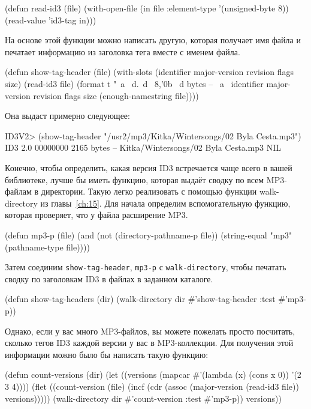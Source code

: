\begin{myverb}
(defun read-id3 (file)
  (with-open-file (in file :element-type '(unsigned-byte 8))
    (read-value 'id3-tag in)))
\end{myverb}

На основе этой функции можно написать другую, которая получает имя файла и печатает
информацию из заголовка тега вместе с именем файла.

\begin{myverb}
(defun show-tag-header (file)
  (with-slots (identifier major-version revision flags size) (read-id3 file)
    (format t "~a ~d.~d ~8,'0b ~d bytes -- ~a~%
            identifier major-version revision flags size (enough-namestring file))))
\end{myverb}

Она выдаст примерно следующее:

\begin{myverb}
ID3V2> (show-tag-header "/usr2/mp3/Kitka/Wintersongs/02 Byla Cesta.mp3")
ID3 2.0 00000000 2165 bytes -- Kitka/Wintersongs/02 Byla Cesta.mp3
NIL
\end{myverb}

Конечно, чтобы определить, какая версия ID3 встречается чаще всего в вашей библиотеке,
лучше бы иметь функцию, которая выдаёт сводку по всем MP3-файлам в директории. Такую легко
реализовать с помощью функции walk-directory из главы~\ref{ch:15}. Для начала определим
вспомогательную функцию, которая проверяет, что у файла расширение MP3.

\begin{myverb}
(defun mp3-p (file)
  (and
   (not (directory-pathname-p file))
   (string-equal "mp3" (pathname-type file))))
\end{myverb}

Затем соединим \lstinline{show-tag-header}, \lstinline{mp3-p} с \lstinline{walk-directory}, чтобы
печатать сводку по заголовкам ID3 в файлах в заданном каталоге.

\begin{myverb}
(defun show-tag-headers (dir) 
  (walk-directory dir #'show-tag-header :test #'mp3-p))
\end{myverb}

Однако, если у вас много MP3-файлов, вы можете пожелать просто посчитать, сколько тегов
ID3 каждой версии у вас в MP3-коллекции.  Для получения этой информации можно было бы
написать такую функцию:

\begin{myverb}
(defun count-versions (dir)
  (let ((versions (mapcar #'(lambda (x) (cons x 0)) '(2 3 4))))
    (flet ((count-version (file)
             (incf (cdr (assoc (major-version (read-id3 file)) versions)))))
      (walk-directory dir #'count-version :test #'mp3-p))
    versions))
\end{myverb}

